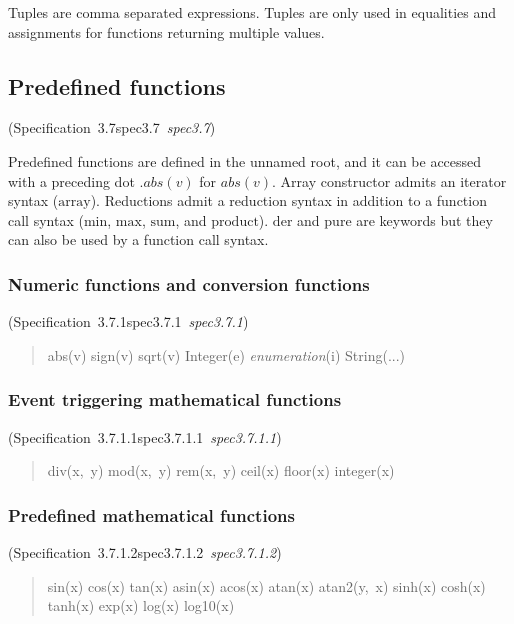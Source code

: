 \documentclass[10pt,b5paper]{article}
\def\specrefx#1#2{Specification~#1\ifx\relax#2\relax{}\else~{\it{}#2}\fi}
\def\specref#1{\specrefx{#1}{\csname spec#1\endcsname}}
\begin{document}
\noindent Tuples are comma separated expressions.  Tuples are only
used in equalities and assignments for functions returning multiple
values.


\subsection{Predefined functions}
(\specref{3.7}\/)

Predefined functions are defined in the unnamed root, and it can be
accessed with a preceding dot $.\mathit{abs}(v)$ for
$\mathit{abs}(v)$.  Array constructor admits an iterator syntax
($\mathrm{array}$).  Reductions admit a reduction syntax in addition
to a function call syntax ($\mathrm{min}$, $\mathrm{max}$,
$\mathrm{sum}$, and $\mathrm{product}$).  $\mathrm{der}$ and
$\mathrm{pure}$ are keywords but they can also be used by a function
call syntax.

\subsubsection*{Numeric functions and conversion functions}
(\specref{3.7.1}\/)

\begin{quote}\widespacing

abs(v)
sign(v)
sqrt(v)
Integer(e)
{\it{}enumeration}(i)
String(...)

\end{quote}

\subsubsection*{Event triggering mathematical functions}
(\specref{3.7.1.1}\/)

\begin{quote}\widespacing

div(x,~y)
mod(x,~y)
rem(x,~y)
ceil(x)
floor(x)
integer(x)

\end{quote}

\subsubsection*{Predefined mathematical functions}
(\specref{3.7.1.2}\/)

\begin{quote}\widespacing

sin(x)
cos(x)
tan(x)
asin(x)
acos(x)
atan(x)
atan2(y,~x)
sinh(x)
cosh(x)
tanh(x)
exp(x)
log(x)
log10(x)

\end{quote}
\end{document}
